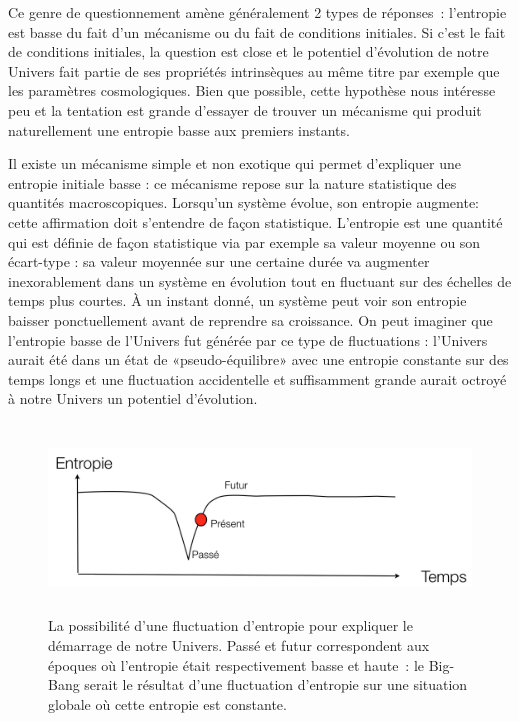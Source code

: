 Ce genre de questionnement amène généralement 2 types de réponses~: l'entropie est basse du fait d'un mécanisme ou du fait de conditions initiales. Si c'est le fait de conditions initiales, la question est close et le potentiel d'évolution de notre Univers fait partie de ses propriétés intrinsèques au même titre par exemple que les paramètres cosmologiques. Bien que possible, cette hypothèse nous intéresse peu et la tentation est grande d'essayer de trouver un mécanisme qui produit naturellement une entropie basse aux premiers instants.

Il existe un mécanisme simple et non exotique qui permet d'expliquer une entropie initiale basse : ce mécanisme repose sur la nature statistique des quantités macroscopiques. Lorsqu'un système évolue, son entropie augmente: cette affirmation doit s'entendre de façon statistique. L'entropie est une quantité qui est définie de façon statistique via par exemple sa valeur moyenne ou son écart-type : sa valeur moyennée sur une certaine durée va augmenter inexorablement dans un système en évolution tout en fluctuant sur des échelles de temps plus courtes. À un instant donné, un système peut voir son entropie baisser ponctuellement avant de reprendre sa croissance. On peut imaginer que l'entropie basse de l'Univers fut générée par ce type de fluctuations : l'Univers aurait été dans un état de «pseudo-équilibre» avec une entropie constante sur des temps longs et une fluctuation accidentelle et suffisamment grande aurait octroyé à notre Univers un potentiel d'évolution.
\begin{figure}[htbp]
	\centering
		\includegraphics[height=5cm]{figs/fluctuation.png}
	\caption[fluctuation d'entropie]{La possibilité d'une fluctuation d'entropie pour expliquer le démarrage de notre Univers. Passé et futur correspondent aux époques où l'entropie était respectivement basse et haute~: le Big-Bang serait le résultat d'une fluctuation d'entropie sur une situation globale où cette entropie est constante.}
	\label{f:fluctuation}
\end{figure}

